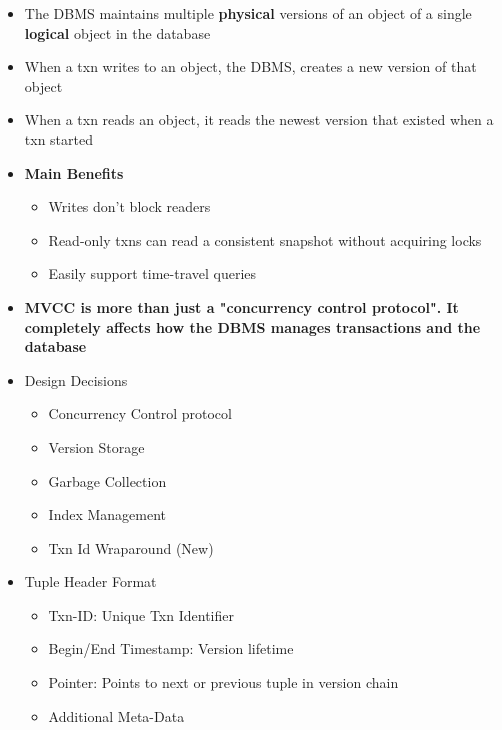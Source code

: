 \documentclass[11pt]{article}
\begin{document}
\begin{itemize}
    \item The DBMS maintains multiple \textbf{physical} versions of an object of a single \textbf{logical} object in the database
    \item When a txn writes to an object, the DBMS, creates a new version of that object
    \item When a txn reads an object, it reads the newest version that existed when a txn started
    \item \textbf{Main Benefits}
    \begin{itemize}
        \item Writes don't block readers
        \item Read-only txns can read a consistent snapshot without acquiring locks
        \item Easily support time-travel queries
    \end{itemize}
    \item \textbf{MVCC is more than just a "concurrency control protocol". It completely affects how the DBMS manages transactions and the database}
    \item Design Decisions~\cite{p781-wu}
    \begin{itemize}
        \item Concurrency Control protocol
        \item Version Storage
        \item Garbage Collection
        \item Index Management
        \item Txn Id Wraparound (New)
    \end{itemize}
    \item Tuple Header Format
    \begin{itemize}
        \item Txn-ID: Unique Txn Identifier
        \item Begin/End Timestamp: Version lifetime
        \item Pointer: Points to next or previous tuple in version chain
        \item Additional Meta-Data
    \end{itemize}
\end{itemize}
\end{document}
